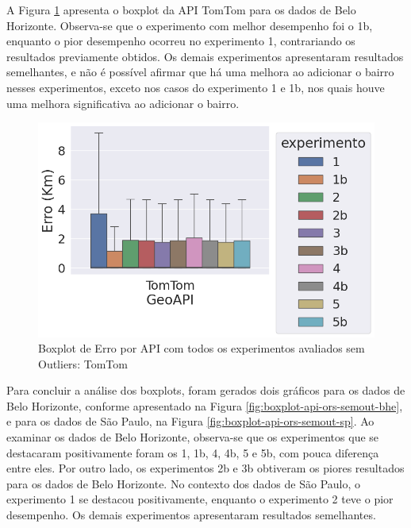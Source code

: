 A Figura \ref{fig:boxplot-api-tomtom-semout-bh} apresenta o boxplot da API TomTom para os dados de Belo Horizonte. Observa-se que o experimento com melhor desempenho foi o 1b, enquanto o pior desempenho ocorreu no experimento 1, contrariando os resultados previamente obtidos. Os demais experimentos apresentaram resultados semelhantes, e não é possível afirmar que há uma melhora ao adicionar o bairro nesses experimentos, exceto nos casos do experimento 1 e 1b, nos quais houve uma melhora significativa ao adicionar o bairro.

\begin{figure}[h]
    \centering
    \includegraphics[width=\textwidth]{Figuras/boxplotApiTomtomSemOut.png}
    \caption{Boxplot de Erro por API com todos os experimentos avaliados sem Outliers: TomTom}
    \label{fig:boxplot-api-tomtom-semout-bh}
\end{figure}

Para concluir a análise dos boxplots, foram gerados dois gráficos para os dados de Belo Horizonte, conforme apresentado na Figura \ref{fig:boxplot-api-ors-semout-bhe}, e para os dados de São Paulo, na Figura \ref{fig:boxplot-api-ors-semout-sp}. Ao examinar os dados de Belo Horizonte, observa-se que os experimentos que se destacaram positivamente foram os 1, 1b, 4, 4b, 5 e 5b, com pouca diferença entre eles. Por outro lado, os experimentos 2b e 3b obtiveram os piores resultados para os dados de Belo Horizonte. No contexto dos dados de São Paulo, o experimento 1 se destacou positivamente, enquanto o experimento 2 teve o pior desempenho. Os demais experimentos apresentaram resultados semelhantes.


